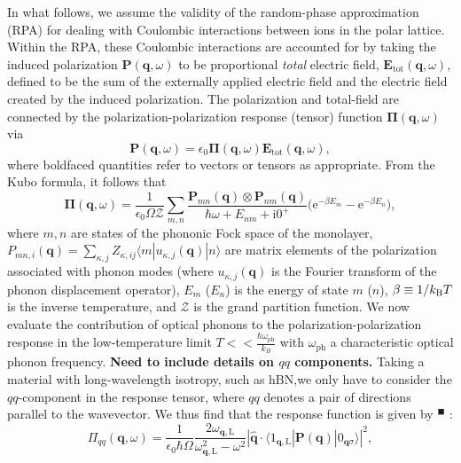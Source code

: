 \documentclass[aps,prb,twocolumn,
	           groupedaddress,superscriptaddress,
               amsfonts,amssymb,amsmath,floatfix,
	           citeautoscript]{revtex4-1}
\newcommand{\iu}{\mathrm{i}}
\newcommand{\e}{\mathrm{e}}
\newcommand{\citeremind}[1]{%
	\unskip%
    \textcolor{blue!75!black!80!yellow}{${}^\blacksquare$%
	\ifthenelse{\isempty{#1}}{}{\textsuperscript{\tiny\textsf{#1}}}%
	}\xspace}
\begin{document}
In what follows, we assume the validity of the random-phase approximation (RPA) for dealing with Coulombic interactions between ions in the polar lattice. Within the RPA, these Coulombic interactions are accounted for by taking the induced polarization $\mathbf{P}(\mathbf{q},\omega)$ to be proportional \textit{total} electric field, $\mathbf{E}_{\mathrm{tot}}(\mathbf{q},\omega)$, defined to be the sum of the externally applied electric field and the electric field created by the induced polarization. The polarization and total-field are connected by the polarization-polarization response (tensor) function  $\boldsymbol{\Pi}(\mathbf{q},\omega)$ via
\begin{equation}
\mathbf{P}(\mathbf{q},\omega)  = \epsilon_0\boldsymbol{\Pi}(\mathbf{q},\omega)\mathbf{E}_{\mathrm{tot}}(\mathbf{q},\omega),
\end{equation}
where boldfaced quantities refer to vectors or tensors as appropriate.
From the Kubo formula, it follows that
\begin{equation}\label{eq:2dsusceptibility}
    \boldsymbol{\Pi}(\mathbf{q},\omega) =  \frac{1}{\epsilon_0 \Omega\mathcal{Z}}\sum\limits_{m,n}\frac{\mathbf{P}_{mn}(\mathbf{q})\otimes\mathbf{P}_{nm}(\mathbf{q})}{\hbar\omega + E_{nm}+\iu 0^+}\Big(\e^{-\beta E_m}-\e^{-\beta E_n} \Big),
\end{equation}
where $m,n$ are states of the phononic Fock space of the monolayer, $P_{mn,i}(\mathbf{q}) = \sum_{\kappa,j}Z_{\kappa,ij}\langle m | u_{\kappa,j}(\mathbf{q}) | n \rangle$ are matrix elements of the polarization associated with phonon modes (where $u_{\kappa,j}(\mathbf{q})$ is the Fourier transform of the phonon displacement operator), $E_{m}$ ($E_n$) is the energy of state $m$ ($n$), $\beta \equiv 1/k_{\text{\textsc{B}}}T$ is the inverse temperature, and $\mathcal{Z}$ is the grand partition function. We now evaluate the contribution of optical phonons to the polarization-polarization response in the low-temperature limit $T << \frac{\hbar\omega_{\mathrm{ph}}}{k_B}$ with $\omega_{\mathrm{ph}}$ a characteristic optical phonon frequency. \textbf{Need to include details on $qq$ components.} Taking a material with long-wavelength isotropy, such as hBN,we only have to consider the $qq$-component in the response tensor, where $qq$ denotes a pair of directions parallel to the wavevector. We thus find that the response function is given by \citeremind{}: 
\begin{equation}
    \Pi_{qq}(\mathbf{q},\omega) = \frac{1}{\epsilon_0\hbar\Omega} \frac{2\omega_{\mathbf{q},\mathrm{L}}}{\omega^2_{\mathbf{q},\mathrm{L}}-\omega^2}|\hat{\mathbf{q}}\cdot\langle 1_{\mathbf{q},\mathrm{L}}|\mathbf{P}(\mathbf{q})|0_{\mathbf{q}\sigma}\rangle|^2,
    \label{eq:polpolresponse}
\end{equation}
\end{document}
